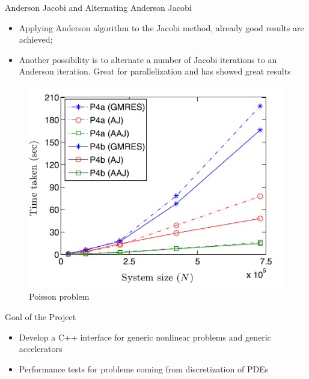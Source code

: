 \documentclass{beamer}
\begin{document}
				
				\begin{frame}{Anderson Jacobi and Alternating Anderson Jacobi}
					\begin{itemize}
						\item Applying Anderson algorithm to the Jacobi method, already good results are achieved;
						\item Another possibility is to alternate a number of Jacobi iterations to an Anderson iteration. Great for parallelization and has showed great results \cite{p2}
					\end{itemize}
					
					\begin{figure}
						\includegraphics[scale= 0.5]{AAJ.png}
						\caption{Poisson problem \cite{p2}}
					\end{figure}
				\end{frame}
				
				\begin{frame}{Goal of the Project}
					\begin{itemize}
						\item Develop a C++ interface for generic nonlinear problems and generic accelerators
						\item Performance tests for problems coming from discretization of PDEs
						
						
					\end{itemize}
					
					
				\end{frame}
				
				
\end{document}

